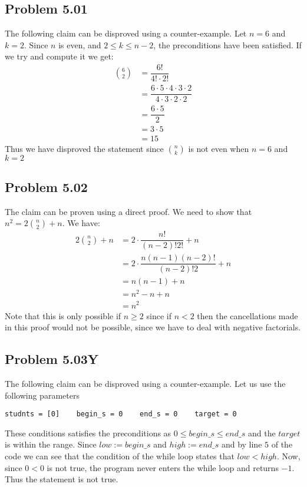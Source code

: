 \documentclass[12pt]{article}
\begin{document}
\subsection*{Problem 5.01}
The following claim can be disproved using a counter-example. Let $n = 6$ and $k = 2$. Since $n$ is even, and $2 \leq k \leq n-2$, the preconditions have been satisfied. If we try and compute it we get:
\begin{align*}
6 \choose{2} &= \dfrac{6!}{4! \cdot 2!}\\
&= \dfrac{6 \cdot 5 \cdot 4 \cdot 3 \cdot 2}{4 \cdot 3 \cdot 2 \cdot 2}\\
&= \dfrac{6 \cdot 5}{2}\\
&= 3 \cdot 5\\
&= 15
\end{align*}
Thus we have disproved the statement since $n \choose k$ is not even when $n = 6$ and $k = 2$

\subsection*{Problem 5.02}
The claim can be proven using a direct proof. We need to show that $n^2 = 2 {n \choose 2} +n$. We have:
\begin{align*}
2 {n \choose 2} +n &= 2 \cdot \dfrac{n!}{(n-2)!2!} + n\\
&= 2 \cdot \dfrac{n(n-1)(n-2)!}{(n-2)!2} + n\\
&= n(n-1) + n\\
&= n^2 - n + n\\
&= n^2
\end{align*}
Note that this is only possible if $n \geq 2$ since if $n < 2$ then the cancellations made in this proof would not be possible, since we have to deal with negative factorials.


\newpage
\subsection*{Problem 5.03Y}
The following claim can be disproved using a counter-example. Let us use the following parameters
\begin{verbatim}
studnts = [0]    begin_s = 0    end_s = 0    target = 0
\end{verbatim}
These conditions satisfies the preconditions as $0 \leq begin\_s \leq end\_s$ and the $target$ is within the range. Since $low := begin\_s$ and $high := end\_s$ and by line $5$ of the code we can see that the condition of the while loop states that $low < high$. Now, since $0 < 0$ is not true, the program never enters the while loop and returns $-1$. Thus the statement is not true.
\end{document}
